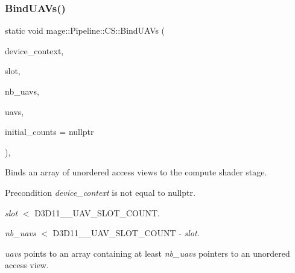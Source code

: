 \subsubsection{\texorpdfstring{Bind\+U\+A\+Vs()}{BindUAVs()}}
{\footnotesize\ttfamily static void mage\+::\+Pipeline\+::\+C\+S\+::\+Bind\+U\+A\+Vs (\begin{DoxyParamCaption}\item[{I\+D3\+D11\+Device\+Context2 $\ast$}]{device\+\_\+context,  }\item[{\hyperlink{namespacemage_a41c104c036fba3756a74e19f793eeaa1}{U32}}]{slot,  }\item[{\hyperlink{namespacemage_a41c104c036fba3756a74e19f793eeaa1}{U32}}]{nb\+\_\+uavs,  }\item[{I\+D3\+D11\+Unordered\+Access\+View $\ast$const $\ast$}]{uavs,  }\item[{const \hyperlink{namespacemage_a41c104c036fba3756a74e19f793eeaa1}{U32} $\ast$}]{initial\+\_\+counts = {\ttfamily nullptr} }\end{DoxyParamCaption})\hspace{0.3cm}{\ttfamily [static]}, {\ttfamily [noexcept]}}

Binds an array of unordered access views to the compute shader stage.

\begin{DoxyPrecond}{Precondition}
{\itshape device\+\_\+context} is not equal to {\ttfamily nullptr}. 

{\itshape slot} $<$ {\ttfamily D3\+D11\+\_\+\_\+\+U\+A\+V\+\_\+\+S\+L\+O\+T\+\_\+\+C\+O\+U\+NT}. 

{\itshape nb\+\_\+uavs} $<$ {\ttfamily D3\+D11\+\_\+\_\+\+U\+A\+V\+\_\+\+S\+L\+O\+T\+\_\+\+C\+O\+U\+NT} -\/ {\itshape slot}. 

{\itshape uavs} points to an array containing at least {\itshape nb\+\_\+uavs} pointers to an unordered access view. 
\end{DoxyPrecond}

